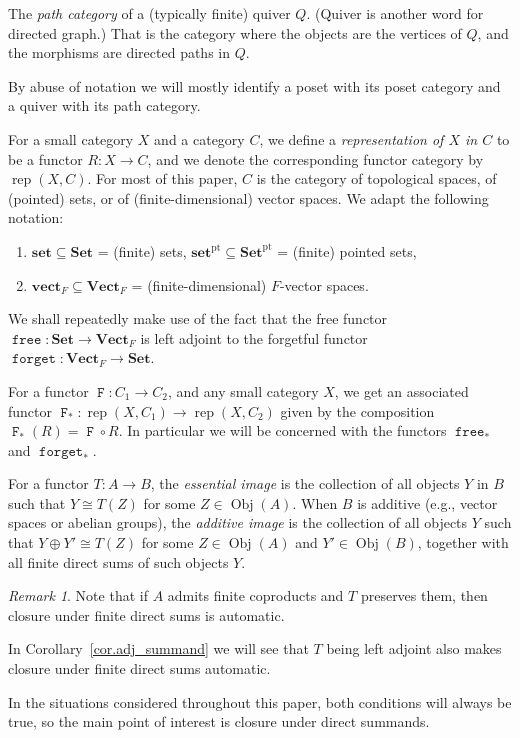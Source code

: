 \documentclass[a4paper]{amsart}
\theoremstyle{plain}
\theoremstyle{definition}
\theoremstyle{remark}
\newtheorem{remark}[theorem]{Remark}
\newcommand{\funct}[1]{\operatorname{\mathtt{#1}}}
\newcommand{\Set}{\mathbf{Set}}
\newcommand{\set}{\mathbf{set}}
\newcommand{\pSet}{\mathbf{Set}^\mathrm{pt}}
\newcommand{\pset}{\mathbf{set}^\mathrm{pt}}
\newcommand{\VectF}{\mathbf{Vect}_F}
\newcommand{\vectF}{\mathbf{vect}_F}
\DeclareMathOperator{\rep}{rep}
\begin{document}
The \emph{path category} of a (typically finite) quiver \( Q \). (Quiver is another word for directed graph.) That is the category where the objects are the vertices of $Q$, and the morphisms are directed paths in $Q$.

By abuse of notation we will mostly identify a poset with its poset category and a quiver with its path category. 

For a small category $X$ and a category $C$, we define a \emph{representation of $X$ in $C$} to be a functor $R\colon X\to C$, and we denote the corresponding functor category by $\rep(X,C)$. For most of this paper, $C$ is the category of topological spaces, of (pointed) sets, or  of (finite-dimensional) vector spaces. We adapt the following notation: 
\begin{enumerate}
\item $\set\subseteq \Set$ = (finite) sets, $\pset \subseteq \pSet$ = (finite) pointed sets,
\item $\vectF\subseteq\VectF$ = (finite-dimensional) $F$-vector spaces.
\end{enumerate}
We shall repeatedly make use of the fact that the free functor
$\funct{free} \colon \Set \to \VectF$
is left adjoint to the forgetful functor $\funct{forget} \colon \VectF \to \Set$.

For a functor \( \funct{F} \colon C_1 \to C_2 \), and any small category \( X \), we get an associated functor \( \funct{F}_* \colon \rep(X, C_1) \to \rep(X, C_2) \) given by the composition \( \funct{F}_*(R) = \funct{F} \circ R \). In particular we will be concerned with the functors \( \funct{free}_* \) and \( \funct{forget}_* \).

For a functor \( T \colon A \to B \), the \emph{essential image} is the collection of all objects \( Y \) in \( B \) such that \( Y \cong T(Z) \) for some \( Z \in \operatorname{Obj}(A) \). When \( B \) is additive (e.g., vector spaces or abelian groups), the \emph{additive image} is the collection of all objects \( Y \) such that \( Y \oplus Y' \cong T(Z) \) for some \( Z \in \operatorname{Obj}(A) \) and \( Y' \in \operatorname{Obj}(B) \), together with all finite direct sums of such objects \(Y\). 

\begin{remark}
\label{rem.addimage}
Note that if \(A\) admits finite coproducts and \(T\) preserves them, then closure under finite direct sums is automatic.

In Corollary~\ref{cor.adj_summand} we will see that \( T \) being left adjoint also makes closure under finite direct sums automatic.

In the situations considered throughout this paper, both conditions will always be true, so the main point of interest is closure under direct summands.
\end{remark}
\end{document}
